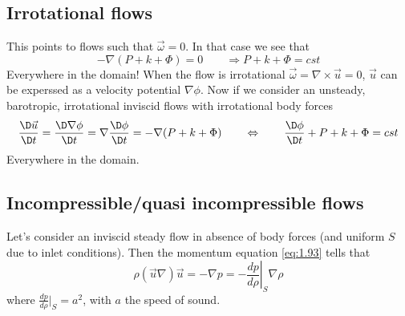 	\subsection{Irrotational flows}
		This points to flows such that $\vec{\omega} = 0$. In that case we see that 
		\begin{equation}
			-\nabla (P+k+\Phi) = 0 \qquad \Rightarrow P+k+\Phi = cst 
		\end{equation}
		Everywhere in the domain! When the flow is irrotational $\vec{\omega} = \nabla \times \vec{u} = 0$, $\vec{u}$ can be experssed as a velocity potential $\nabla \phi$. Now if we consider an unsteady, barotropic, irrotational inviscid flows with irrotational body forces 
		\begin{equation}
			\frac{\D \vec{u}}{\D t} = \frac{\D \nabla \phi}{\D t} = \nabla \frac{\D \phi }{\D t} = -\nabla (P+k+\Phi) \qquad \Leftrightarrow \qquad \frac{\D \phi}{\D t} + P + k +\Phi = cst 
		\end{equation}
		Everywhere in the domain. 
		
	\subsection{Incompressible/quasi incompressible flows}
		Let's consider an inviscid steady flow in absence of body forces (and uniform $S$ due to inlet conditions). Then the momentum equation \eqref{eq:1.93} tells that
		\begin{equation}
			\rho (\vec{u}\nabla )\vec{u} = -\nabla p  = - \left.\frac{dp}{d\rho}\right|_{S} \nabla \rho 
		\end{equation}
		where $\frac{dp}{d\rho}|_S = a^2$, with $a$ the speed of sound. 
		
